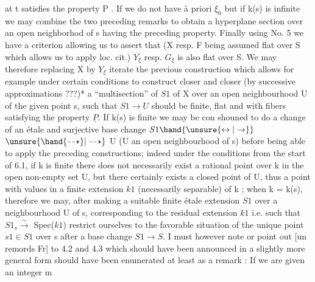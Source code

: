 
at t satisfies the property P . If we do not have à priori $\xi_0$ but
if k(s) is infinite we may combine the two preceding remarks to
obtain a hyperplane section over an open neighborhod of s having
the preceding property. Finally using No. 5 we have a criterion
allowing us to assert that (X resp. F being assumed flat over S
which allows us to apply loc. cit.) $Y_\xi$ resp. $G_\xi$ is also flat over
S. We may therefore replacing X by $Y_\xi$ iterate the previous
construction which allows for example under certain conditions to
construct closer and closer (by successive approximations ???)* a
``multisection'' of $S1$ of X over an open neighbourhood U of the given
point s, such that $S1 \to U$ should be finite, flat and with fibers
satisfying the property $\underline{P}$. If k(s) is finite we may be con
shouned to do a change of an étale and surjective base change $S1 \hand{\unsure{\leftrightarrow|\rightarrow}}$
$\unsure{\hand{\dashrightarrow}|\dashrightarrow}$ U (U an open neighbourhood of s) before being able to apply
the preceding constructions; indeed under the conditions from the
start of 6.1, if k is finite there does not necessarily exist a
rational point over k in the open non-empty set U, but there
certainly exists a closed point of U, thus a point with values in
a finite extension $k1$ (necessarily separable) of k ; when k =
k(s), therefore we may, after making a suitable finite étale
extension $S1$ over a neighbourhood U of s, corresponding to the
residual extension $k1$ i.e. such that $S1_s \xrightarrow{\sim}$ Spec($k1$) restrict
ourselves to the favorable situation of the unique point $s1 \in S1$
over s after a base change $S1 \to S$. I must however note or point
out [un remords Fr] to 4.2 and 4.3 which should have been
announced in a slightly more general form should have been
enumerated at least as a remark : If we are given an integer m

